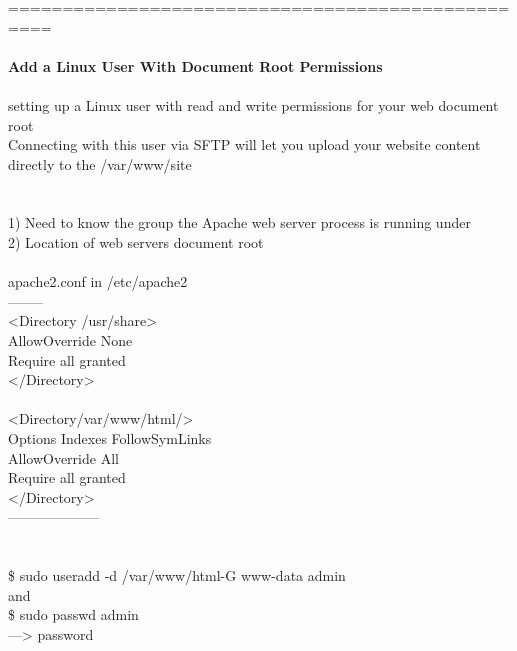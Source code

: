 \documentclass[10pt,a4paper]{article}
\begin{document}
{{{{{{{{{{{{{{{{\\
\\
\\
\\
\\
\\
\\
\\
\\
\\
==================================================\\
\\
\textbf{Add a Linux User With Document Root Permissions}}{\large \\
\\
setting up a Linux user with read and write permissions for your web document root}{\large \\
Connecting with this user via SFTP will let you upload your website content directly to the /var/www/site}{\large \\
\\
\\
1) Need to know the group the Apache web server process is running under\\
2) Location of web servers document root\\
\\
apache2.conf in /etc/apache2}{\large  \\
--------\\
<Directory /usr/share>}{\large \\
        AllowOverride None\\
        Require all granted\\
</Directory>\\
\\
<Directory/var/www/html/>}{\large {\large \\
        Options Indexes FollowSymLinks\\
        AllowOverride All\\
        Require all granted\\
</Directory>\\
--------------------\\
\\
\\
\$ sudo useradd -d /var/www/html}{\large  -G www-data admin}{\large \\
and\\
\$ sudo passwd admin}{\large \\
---> password\\
\\
}}}}}}}}}}}}}}}}}
\end{document}
